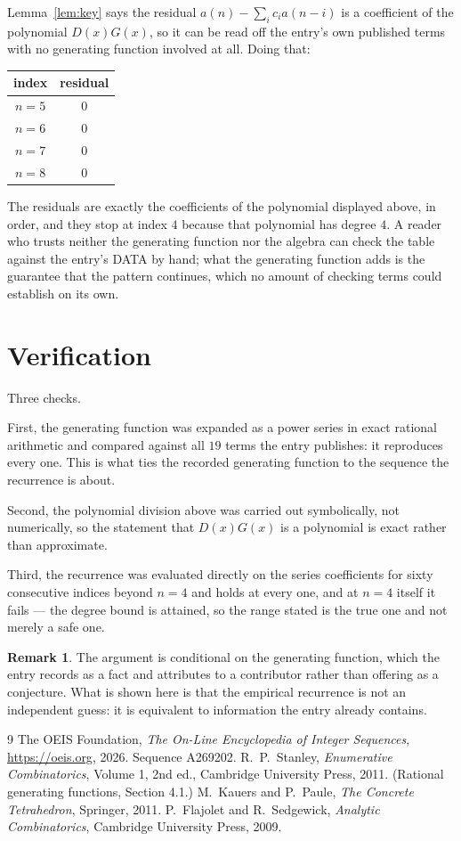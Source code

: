 \documentclass[11pt,a4paper]{article}
\theoremstyle{plain}
\theoremstyle{definition}
\newtheorem{remark}[theorem]{Remark}
\begin{document}
Lemma~\ref{lem:key} says the residual $a(n)-\sum_ic_ia(n-i)$ is a coefficient of the
polynomial $D(x)G(x)$, so it can be read off the entry's own published terms with no
generating function involved at all. Doing that:
\begin{center}
\begin{tabular}{cc}
index & residual \\ \hline
$n=5$ & $0$ \\
$n=6$ & $0$ \\
$n=7$ & $0$ \\
$n=8$ & $0$
\end{tabular}
\end{center}
The residuals are exactly the coefficients of the polynomial displayed above, in order, and
they stop at index $4$ because that polynomial has degree $4$. A reader who trusts
neither the generating function nor the algebra can check the table against the entry's DATA
by hand; what the generating function adds is the guarantee that the pattern continues, which
no amount of checking terms could establish on its own.

\section{Verification}

Three checks.

First, the generating function was expanded as a power series in exact rational arithmetic and
compared against all $19$ terms the entry publishes: it reproduces every one. This is
what ties the recorded generating function to the sequence the recurrence is about.

Second, the polynomial division above was carried out symbolically, not numerically, so the
statement that $D(x)G(x)$ is a polynomial is exact rather than approximate.

Third, the recurrence was evaluated directly on the series coefficients for sixty consecutive
indices beyond $n=4$ and holds at every one, and at $n=4$ itself it fails --- the
degree bound is attained, so the range stated is the true one and not merely a safe one.

\begin{remark}
The argument is conditional on the generating function, which the entry records as a fact and
attributes to a contributor rather than offering as a conjecture. What is shown here is that
the empirical recurrence is not an independent guess: it is equivalent to information the
entry already contains.
\end{remark}

\begin{thebibliography}{9}
 The OEIS Foundation, \emph{The On-Line Encyclopedia of Integer
Sequences}, \url{https://oeis.org}, 2026. Sequence A269202.
 R.~P.~Stanley, \emph{Enumerative Combinatorics}, Volume 1, 2nd ed.,
Cambridge University Press, 2011. (Rational generating functions, Section 4.1.)
 M.~Kauers and P.~Paule, \emph{The Concrete Tetrahedron}, Springer, 2011.
 P.~Flajolet and R.~Sedgewick, \emph{Analytic Combinatorics}, Cambridge
University Press, 2009.
\end{thebibliography}
\end{document}
